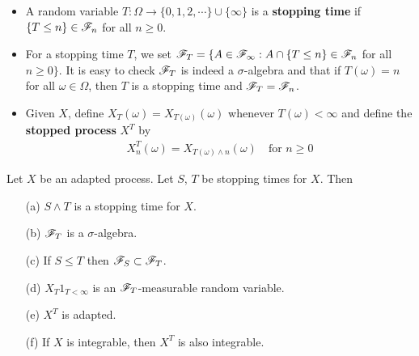\documentclass[12pt,a4paper]{report}
\begin{document}
\begin{itemize}
\item A random variable $T:\Omega \rightarrow \{ 0,1,2,\cdots \} \cup \{\infty\}$ is a \textbf{stopping time} if $\{ T\leq n\}\in \mathscr{F}_n$ for all $n \geq 0$.

\item For a stopping time $T$, we set $\mathscr{F}_T = \{ A\in \mathscr{F}_{\infty} : A\cap \{ T\leq n \} \in \mathscr{F}_n$ for all $n\geq 0 \}$. It is easy to check $\mathscr{F}_T$ is indeed a $\sigma$-algebra and that if $T(\omega) = n$ for all $\omega \in \Omega$, then $T$ is a stopping time and $\mathscr{F}_T = \mathscr{F}_n$.

\item Given $X$, define $X_T(\omega) = X_{T(\omega)}(\omega)$ whenever $T(\omega) <\infty$ and define the \textbf{stopped process} $X^T$ by
\begin{align*}
X_n^T (\omega)  = X_{T(\omega) \wedge n} (\omega) \quad \text{for } n\geq 0
\end{align*}
\end{itemize}

 Let $X$ be an adapted process. Let $S$, $T$ be stopping times for $X$. Then
\begin{itemize}
\item[(a)] $S\wedge T$ is a stopping time for $X$.
\item[(b)] $\mathscr{F}_T$ is a $\sigma$-algebra.
\item[(c)] If $S\leq T$ then $\mathscr{F}_S \subset \mathscr{F}_T$.
\item[(d)] $X_T 1_{T<\infty}$ is an $\mathscr{F}_T$-measurable random variable.
\item[(e)] $X^T$ is adapted.
\item[(f)] If $X$ is integrable, then $X^T$ is also integrable.
\end{itemize}
\end{document}
